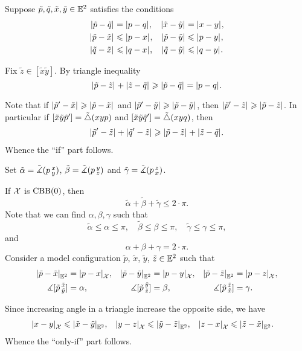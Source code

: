 Suppose $\tilde p,\tilde q,\tilde x,\tilde y\in\mathbb{E}^2$ satisfies the conditions 
\begin{align*}
\dist{\tilde p}{\tilde q}{}&=\dist{p}{q}{},
&
\dist{\tilde x}{\tilde y}{}&=\dist{x}{y}{},
\\
\dist{\tilde p}{\tilde x}{}&\le \dist{p}{x}{},
&
\dist{\tilde p}{\tilde y}{}&\le \dist{p}{y}{},
\\
\dist{\tilde q}{\tilde x}{}&\le \dist{q}{x}{},
&
\dist{\tilde q}{\tilde y}{}&\le \dist{q}{y}{}.
\end{align*}

Fix $\tilde z\in [\tilde x\tilde y]$.
By triangle inequality 
\[\dist{\tilde p}{\tilde z}{}+\dist{\tilde z}{\tilde q}{}\ge \dist{\tilde p}{\tilde q}{}=\dist{p}{q}{}.\]

Note that if 
$\dist{\tilde p'}{\tilde x}{}\ge \dist{\tilde p}{\tilde x}{}$
and
$\dist{\tilde p'}{\tilde y}{}\ge \dist{\tilde p}{\tilde y}{}$,
then $\dist{\tilde p'}{\tilde z}{}\ge \dist{\tilde p}{\tilde z}{}$.
In particular if $[\tilde x\tilde y\tilde p']=\tilde\triangle(xyp)$ and $[\tilde x\tilde y\tilde q']=\tilde\triangle(xyq)$, then
\begin{align*}
 \dist{\tilde p'}{\tilde z}{}+\dist{\tilde q'}{\tilde z}{}\ge \dist{\tilde p}{\tilde z}{}+\dist{\tilde z}{\tilde q}{}.
\end{align*}
Whence the ``if'' part follows.

Set $\tilde\alpha=\tilde\measuredangle(p\,{}^{x}_{y})$, $\tilde\beta=\tilde\measuredangle(p\,{}^{y}_{z})$ and $\tilde\gamma=\tilde\measuredangle(p\,{}^{z}_{x})$.

If $\mathcal{X}$ is $\mathrm{CBB}(0)$, then
\[\tilde\alpha+\tilde\beta+\tilde\gamma\le 2\cdot \pi.\]
Note that we can find $\alpha,\beta,\gamma$ such that 
\[
\tilde\alpha\le\alpha\le\pi,
\quad \tilde\beta\le\beta\le\pi,
\quad\tilde\gamma\le\gamma\le\pi,\]
and
\[\alpha+\beta+\gamma=2\cdot \pi.\]
Consider a model configuration $\tilde p$, $\tilde x$, $\tilde y$, $\tilde z\in\mathbb{E}^2$ such that 
\begin{align*}
\dist{\tilde p}{\tilde x}{\EE^2}&=\dist{p}{x}{\spc{X}},
&
\dist{\tilde p}{\tilde y}{\EE^2}&=\dist{p}{y}{\spc{X}},
&
\dist{\tilde p}{\tilde z}{\EE^2}&=\dist{p}{z}{\spc{X}},
\\
\mangle\hinge {\tilde p}{\tilde x}{\tilde y}&=\alpha,
&
\mangle\hinge {\tilde p}{\tilde y}{\tilde z}&=\beta,
&
\mangle\hinge {\tilde p}{\tilde z}{\tilde x}&=\gamma.
\end{align*}

Since increasing angle in a triangle increase the opposite side, we have 
\begin{align*}
\dist{x}{y}{\spc{X}}&\le\dist{\tilde x}{\tilde y}{\EE^2},
&
\dist{y}{z}{\spc{X}}&\le\dist{\tilde y}{\tilde z}{\EE^2},
&
\dist{z}{x}{\spc{X}}&\le\dist{\tilde z}{\tilde x}{\EE^2}.
\end{align*}
Whence the ``only-if'' part follows.

